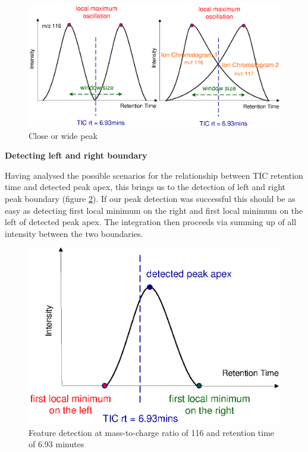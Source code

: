 \begin{figure}
  \begin{center}
    \includegraphics[scale=0.7]{graphics/chapter08/86.eps}
  \end{center}
  \caption{Close or wide peak}
  \label{fig:86}
\end{figure}

{\bf Detecting left and right boundary}

Having analysed the possible scenarios for the relationship between
TIC retention time and detected peak apex, this brings us to the detection
of left and right peak boundary (figure \ref{fig:87}). If our peak detection
was successful this should be as easy as detecting first local minimum on
the right and first local minimum on the left of detected peak apex. The
integration then proceeds via summing up of all intensity between the two
boundaries.

\begin{figure}
  \begin{center}
    \includegraphics[scale=0.7]{graphics/chapter08/87.eps}
  \end{center}
  \caption{Feature detection at mass-to-charge ratio of 116 and retention time
  of 6.93 minutes}
  \label{fig:87}
\end{figure}

